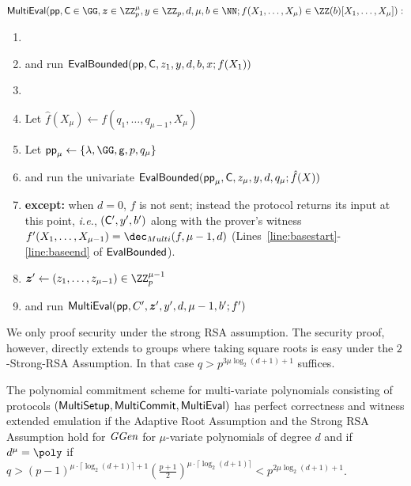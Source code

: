  \begin{mdframed}
\begin{minipage}{\textwidth}
			$\pro{MultiEval}(\params, \gr{C}\in \GG, \boldsymbol{z}\in \ZZ^\mu_p,y \in \ZZ_p, d,\mu,b \in \NN; f(X_1,\dots,X_\mu)\in \ZZ(b)[X_1, \ldots, X_\mu]) :$
			\begin{enumerate}[nolistsep]
			\item {} 
			\item \pcind[1] \prover and \verifier run $\textsf{{EvalBounded}}(\textsf{pp},\mathsf{C},z_1,y,d,b,x;f(X_1))$ 
			\item \pcelse
			\item \pcind[1] Let $\hat{f}(X_\mu)\gets f(q_1,\dots,q_{\mu-1},X_\mu)$
			\item \pcind[1] Let $\crs_\mu \gets \{\lambda,\GG,\gr{g},p,q_\mu\}$
			\item \pcind[1] \prover and \verifier run the univariate $\textsf{{EvalBounded}}(\textsf{pp}_\mu,\mathsf{C},z_\mu,y,d,q_\mu;\hat{f}(X))$
			\item \pcind[2] \textbf{except:} when $d=0$, $f$ is not sent; instead the protocol returns its input at this point, \emph{i.e.}, $(\mathsf{C}',y',b')$ along with the prover's witness $f'(X_1,\dots,X_{\mu-1})=\dec_{Multi}(f,\mu-1,d)$ (Lines~\ref{line:basestart}-\ref{line:baseend} of $\textsf{{EvalBounded}}$). 
			\item \pcind[1]$\boldsymbol{z}'\gets (z_1,\dots,z_{\mu-1})\in \ZZ_p^{\mu-1}$
			\item \pcind[1]\prover and \verifier run $\textsf{{MultiEval}}(\textsf{pp},C',\boldsymbol{z}',y',d,\mu-1,b';f')$
		    \end{enumerate}
      \end{minipage}
\end{mdframed}
We only proof security under the strong RSA assumption. The security proof, however, directly extends to groups where taking square roots is easy under the $2$-Strong-RSA Assumption. In that case $q>p^{3\mu \log_2(d+1)+1}$ suffices.
\begin{theorem}
	The polynomial commitment scheme for multi-variate polynomials consisting of protocols $(\textsf{{MultiSetup}},\textsf{{MultiCommit}},\textsf{{MultiEval}})$ has perfect correctness and witness extended emulation if the Adaptive Root Assumption and the Strong RSA Assumption hold for $\textit{GGen}$ for $\mu$-variate polynomials of degree $d$ and if $d^\mu=\poly$ if $q>(p-1)^{\mu\cdot \lceil \log_2(d+1)\rceil+1}(\frac{p+1}{2})^{\mu \cdot \lceil \log_2(d+1)\rceil}<p^{2 \mu \log_2(d+1)+1}$.
\end{theorem}
